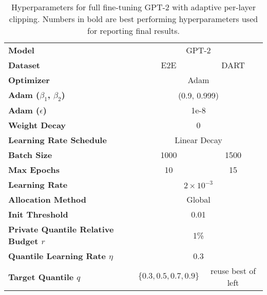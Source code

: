 


\begin{table*}[ht]
\footnotesize
\setlength\tabcolsep{2.4pt}
\centering 
\caption{Hyperparameters for full fine-tuning GPT-2 with adaptive per-layer clipping. Numbers in bold are best performing hyperparameters used for reporting final results. 
} \label{tab:gpt2_tuning}
\begin{tabular}{l cc}
\toprule
\textbf{Model} & \multicolumn{2}{c}{GPT-2} \\
\textbf{Dataset} & E2E & DART \\ 
\midrule
\textbf{Optimizer} & \multicolumn{2}{c}{Adam} \\
\textbf{Adam ($\beta_1$, $\beta_2$)} & \multicolumn{2}{c}{(0.9, 0.999)}   \\
\textbf{Adam ($\epsilon$)} & \multicolumn{2}{c}{1e-8}   \\
\textbf{Weight Decay} & \multicolumn{2}{c}{0} \\
\textbf{Learning Rate Schedule} & \multicolumn{2}{c}{Linear Decay} \\
\textbf{Batch Size} & 1000 & 1500 \\
\textbf{Max Epochs} & 10 & 15 \\
\textbf{Learning Rate} & \multicolumn{2}{c}{$2 \times 10^{-3}$ } \\
\textbf{Allocation Method} & \multicolumn{2}{c}{Global} \\
\textbf{Init Threshold} & \multicolumn{2}{c}{0.01} \\
\textbf{Private Quantile Relative Budget $r$} & \multicolumn{2}{c}{1\%} \\
\textbf{Quantile Learning Rate $\eta$} & \multicolumn{2}{c}{0.3} \\
\textbf{Target Quantile $q$} & $\{\mathbf{0.3}, 0.5, 0.7, 0.9\}$ & reuse best of left \\
\bottomrule
\end{tabular}
\end{table*}
